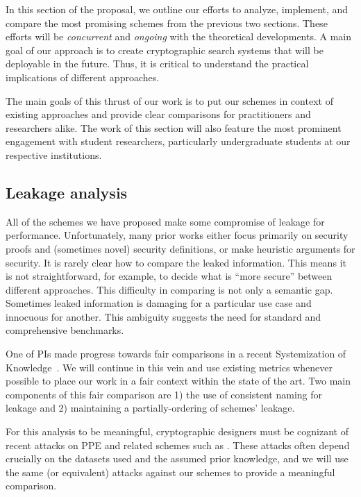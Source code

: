 
In this section of the proposal, we outline our efforts to analyze,
implement, and compare the most promising schemes from the previous two
sections. These efforts will be \emph{concurrent} and \emph{ongoing}
with the theoretical developments. A main goal of our approach is to create cryptographic search systems that will be deployable in the future.  Thus, it is critical to understand
the practical implications of different approaches.

The main goals of this thrust of our work is to put our schemes in
context of existing approaches and provide clear comparisons for
practitioners and researchers alike.
The work of this section will also feature the most prominent engagement
with student researchers, particularly
undergraduate students at our respective institutions.

\subsection{Leakage analysis}

All of the schemes we have proposed make some compromise of leakage for
performance. Unfortunately, many prior works either focus primarily on security
proofs and (sometimes novel) security definitions, or make heuristic
arguments for security. It is rarely clear how to compare the leaked information.  This means it is not
straightforward, for example, to decide what is ``more secure'' between
different approaches.  This difficulty in comparing is not only a semantic gap. Sometimes leaked information is damaging for a particular use case and innocuous for another.  This ambiguity suggests the need for standard and comprehensive benchmarks.

One of PIs made progress towards fair comparisons in a recent
Systemization of Knowledge~\cite{SP:FVYSHG17}. We will continue in this vein and use existing
metrics whenever possible to place our work in a fair context within the
state of the art.  Two main components of this fair comparison are 1) the use of  consistent naming for leakage and 2) maintaining a partially-ordering of schemes' leakage.

For this analysis to be meaningful, cryptographic designers must be cognizant of
recent attacks on PPE and related schemes such as
\cite{CCS:CGPR15,CCS:KKNO16}. These attacks often depend crucially on
the datasets used and the assumed prior knowledge, and we will use the same (or equivalent) attacks
against our schemes to provide a meaningful comparison.

